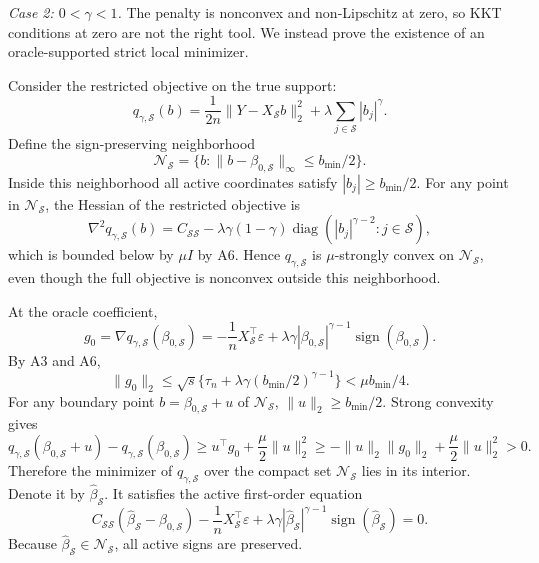 \documentclass{article}
\begin{document}
\emph{Case 2: \(0<\gamma<1\).}
The penalty is nonconvex and non-Lipschitz at zero, so KKT conditions at zero are not the right tool. We instead prove the existence of an oracle-supported strict local minimizer.

Consider the restricted objective on the true support:
\begin{equation}
q_{\gamma,\mathcal S}(b)=
\frac{1}{2n}\|Y-X_{\mathcal S}b\|_2^2+
\lambda\sum_{j\in\mathcal S}|b_j|^\gamma .
\end{equation}
Define the sign-preserving neighborhood
\begin{equation}
\mathcal N_{\mathcal S}=\{b:\|b-\beta_{0,\mathcal S}\|_\infty\le b_{\min}/2\}.
\end{equation}
Inside this neighborhood all active coordinates satisfy \(|b_j|\ge b_{\min}/2\). For any point in \(\mathcal N_{\mathcal S}\), the Hessian of the restricted objective is
\begin{equation}
\nabla^2 q_{\gamma,\mathcal S}(b)
=
C_{\mathcal S\mathcal S}
-
\lambda\gamma(1-\gamma)
\operatorname{diag}(|b_j|^{\gamma-2}:j\in\mathcal S),
\end{equation}
which is bounded below by \(\mu I\) by A6. Hence \(q_{\gamma,\mathcal S}\) is \(\mu\)-strongly convex on \(\mathcal N_{\mathcal S}\), even though the full objective is nonconvex outside this neighborhood.

At the oracle coefficient,
\begin{equation}
g_0=
\nabla q_{\gamma,\mathcal S}(\beta_{0,\mathcal S})
=
-
\frac{1}{n}X_{\mathcal S}^\top\varepsilon
+
\lambda\gamma|\beta_{0,\mathcal S}|^{\gamma-1}
\operatorname{sign}(\beta_{0,\mathcal S}).
\end{equation}
By A3 and A6,
\begin{equation}
\|g_0\|_2
\le
\sqrt{s}\{\tau_n+\lambda\gamma(b_{\min}/2)^{\gamma-1}\}
<\mu b_{\min}/4 .
\end{equation}
For any boundary point \(b=\beta_{0,\mathcal S}+u\) of \(\mathcal N_{\mathcal S}\), \(\|u\|_2\ge b_{\min}/2\). Strong convexity gives
\begin{equation}
q_{\gamma,\mathcal S}(\beta_{0,\mathcal S}+u)-q_{\gamma,\mathcal S}(\beta_{0,\mathcal S})
\ge
u^\top g_0+\frac{\mu}{2}\|u\|_2^2
\ge
-\|u\|_2\|g_0\|_2+\frac{\mu}{2}\|u\|_2^2>0 .
\end{equation}
Therefore the minimizer of \(q_{\gamma,\mathcal S}\) over the compact set \(\mathcal N_{\mathcal S}\) lies in its interior. Denote it by \(\widehat\beta_{\mathcal S}\). It satisfies the active first-order equation
\begin{equation}
C_{\mathcal S\mathcal S}(\widehat\beta_{\mathcal S}-\beta_{0,\mathcal S})
-
\frac{1}{n}X_{\mathcal S}^\top\varepsilon
+
\lambda\gamma|\widehat\beta_{\mathcal S}|^{\gamma-1}
\operatorname{sign}(\widehat\beta_{\mathcal S})=0 .
\label{eq:active_nonconvex_lgamma}
\end{equation}
Because \(\widehat\beta_{\mathcal S}\in\mathcal N_{\mathcal S}\), all active signs are preserved.
\end{document}
